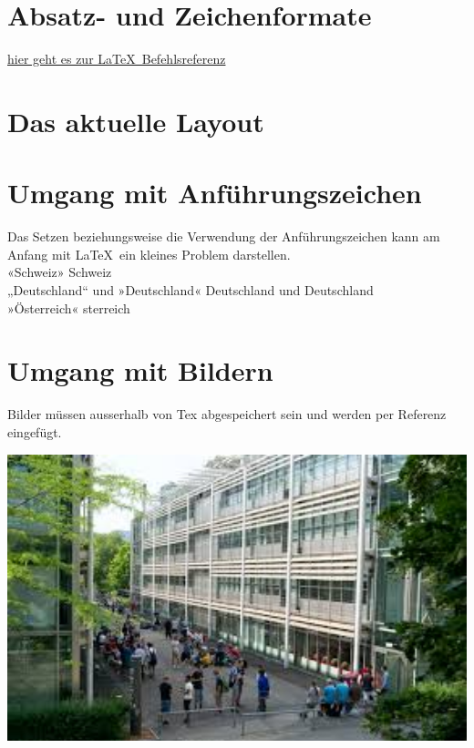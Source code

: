 \section{Absatz- und Zeichenformate}
\href{https://golatex.de/wiki/Kategorie:Befehlsreferenz}{hier geht es zur \LaTeX\ Befehlsreferenz}

\section{Das aktuelle Layout}
\vspace{1cm}
\layout

\section{Umgang mit Anführungszeichen}
Das Setzen beziehungsweise die Verwendung der Anführungszeichen kann am Anfang mit \LaTeX\ ein kleines Problem darstellen.\\
\noindent
«Schweiz» 	\frqq Schweiz\flqq \\
„Deutschland“ und »Deutschland«	  	\glqq Deutschland\grqq{} und \flqq Deutschland\frqq \\
»Österreich« 	sterreich\frqq

\section{Umgang mit Bildern}
Bilder müssen ausserhalb von Tex abgespeichert sein und werden per Referenz eingefügt.

\noindent
\begin{minipage}{1.0\textwidth}
 	\centering
 	\includegraphics[width=1.0\textwidth]{Kapitel/Bilder/gibbBmSchulhausMitSchuelern}
\end{minipage}

